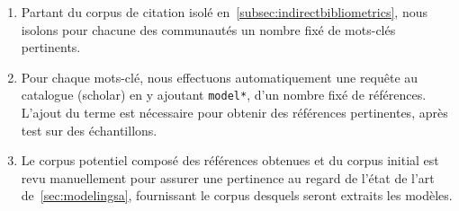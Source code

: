 

\begin{enumerate}
\item Partant du corpus de citation isolé en~\ref{subsec:indirectbibliometrics}, nous isolons pour chacune des communautés un nombre fixé de mots-clés pertinents.
\item Pour chaque mots-clé, nous effectuons automatiquement une requête au catalogue (scholar) en y ajoutant \texttt{model*}, d'un nombre fixé de références. L'ajout du terme est nécessaire pour obtenir des références pertinentes, après test sur des échantillons.
\item Le corpus potentiel composé des références obtenues et du corpus initial est revu manuellement pour assurer une pertinence au regard de l'état de l'art de~\ref{sec:modelingsa}, fournissant le corpus desquels seront extraits les modèles.
\end{enumerate}

